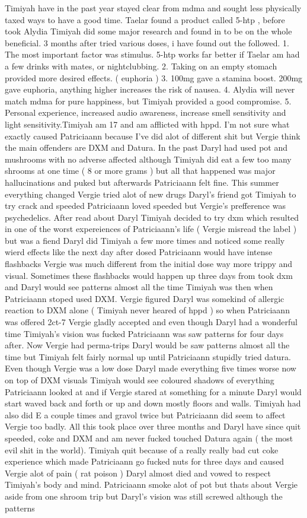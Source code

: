 \documentclass[12pt]{book}
\begin{document}
Timiyah have in the past year stayed clear from mdma and sought less physically taxed ways to have a good time. Taelar found a product called 5-htp , before took Alydia Timiyah did some major research and found in to be on the whole beneficial. 3 months after tried various doses, i have found out the followed. 1. The most important factor was stimulus. 5-htp works far better if Taelar am had a few drinks with mates, or nightclubbing. 2. Taking on an empty stomach provided more desired effects. ( euphoria ) 3. 100mg gave a stamina boost. 200mg gave euphoria, anything higher increases the risk of nausea. 4. Alydia will never match mdma for pure happiness, but Timiyah provided a good compromise. 5. Personal experience, increased audio awareness, increase smell sensitivity and light sensitivity.Timiyah am 17 and am afflicted with hppd. I'm not sure what exactly caused Patriciaann because I've did alot of different shit but Vergie think the main offenders are DXM and Datura. In the past Daryl had used pot and mushrooms with no adverse affected although Timiyah did eat a few too many shrooms at one time ( 8 or more grams ) but all that happened was major hallucinations and puked but afterwards Patriciaann felt fine. This summer everything changed Vergie tried alot of new drugs Daryl's friend got Timiyah to try crack and speeded Patriciaann loved speeded but Vergie's prefference was psychedelics. After read about Daryl Timiyah decided to try dxm which resulted in one of the worst expereiences of Patriciaann's life ( Vergie misread the label ) but was a fiend Daryl did Timiyah a few more times and noticed some really wierd effects like the next day after dosed Patriciaann would have intense flashbacks Vergie was much different from the initial dose way more trippy and visual. Sometimes these flashbacks would happen up three days from took dxm and Daryl would see patterns almost all the time Timiyah was then when Patriciaann stoped used DXM. Vergie figured Daryl was somekind of allergic reaction to DXM alone ( Timiyah never heared of hppd ) so when Patriciaann was offered 2ct-7 Vergie gladly accepted and even though Daryl had a wonderful time Timiyah's vision was fucked Patriciaann was saw patterns for four days after. Now Vergie had perma-trips Daryl would be saw patterns almost all the time but Timiyah felt fairly normal up until Patriciaann stupidly tried datura. Even though Vergie was a low dose Daryl made everything five times worse now on top of DXM visuals Timiyah would see coloured shadows of everything Patriciaann looked at and if Vergie stared at something for a minute Daryl would start waved back and forth or up and down mostly floors and walls. Timiyah had also did E a couple times and gravol twice but Patriciaann did seem to affect Vergie too badly. All this took place over three months and Daryl have since quit speeded, coke and DXM and am never fucked touched Datura again ( the most evil shit in the world). Timiyah quit because of a really really bad cut coke experience which made Patriciaann go fucked nuts for three days and caused Vergie alot of pain ( rat poison ) Daryl almost died and vowed to respect Timiyah's body and mind. Patriciaann smoke alot of pot but thats about Vergie aside from one shroom trip but Daryl's vision was still screwed although the patterns 
\end{document}
